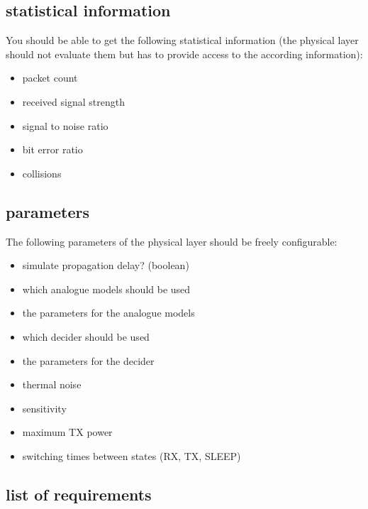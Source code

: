 \subsection{statistical information}
\label{statistic}

You should be able to get the following statistical information (the physical layer should not evaluate them but has to provide access to the according information):

\begin{itemize}
\item packet count
\item received signal strength
\item signal to noise ratio
\item bit error ratio
\item collisions
\end{itemize}

\subsection{parameters}
\label{parameters}

The following parameters of the physical layer should be freely configurable:

\begin{itemize}
	\item simulate propagation delay? (boolean)
	\item which analogue models should be used
	\item the parameters for the analogue models
	\item which decider should be used
	\item the parameters for the decider
	\item thermal noise
	\item sensitivity
	\item maximum TX power
	\item switching times between states (RX, TX, SLEEP)
\end{itemize}

\subsection{list of requirements}
\label{requirements}

